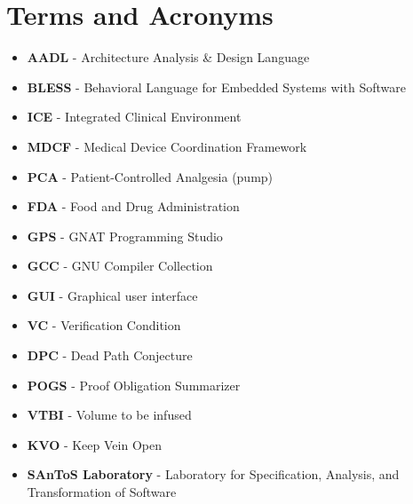 
\cleardoublepage

\chapter{Terms and Acronyms}
\label{Appendix:terms}

\begin{itemize}
  \item \textbf{AADL} - Architecture Analysis \& Design Language
  \item \textbf{BLESS} - Behavioral Language for Embedded Systems with Software
  \item \textbf{ICE} - Integrated Clinical Environment
  \item \textbf{MDCF} - Medical Device Coordination Framework
  \item \textbf{PCA} - Patient-Controlled Analgesia (pump)
  \item \textbf{FDA} - Food and Drug Administration
  \item \textbf{GPS} - GNAT Programming Studio
  \item \textbf{GCC} - GNU Compiler Collection  
  \item \textbf{GUI} - Graphical user interface
  \item \textbf{VC} - Verification Condition
  \item \textbf{DPC} - Dead Path Conjecture
  \item \textbf{POGS} - Proof Obligation Summarizer
  \item \textbf{VTBI} - Volume to be infused
  \item \textbf{KVO} - Keep Vein Open
  \item \textbf{SAnToS Laboratory} - Laboratory for Specification, Analysis, and Transformation of Software
\end{itemize}
